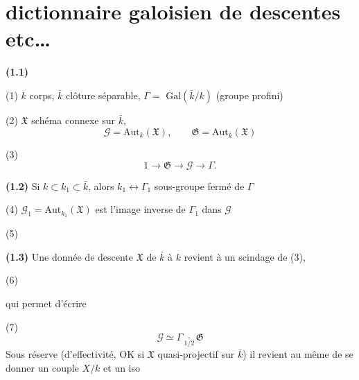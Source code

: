 \documentclass[11pt,a4paper]{article}
\begin{document}
\section{dictionnaire galoisien de descentes etc\ldots}

\textbf{(1.1)}

(1) $k$ corps, $\bar{k}$ clôture séparable, $\Gamma =$  $\mathrm{Gal}(\bar{k}/k)$ (groupe profini)

(2) $\mathfrak{X}$ schéma connexe sur $\bar{k}$,
\[
  \mathcal{G} = \mathrm{Aut}_{k}(\mathfrak{X}), \qquad
  \mathfrak{G} = \mathrm{Aut}_{\bar{k}}(\mathfrak{X})
\]

(3) 
\[
  1 \to \mathfrak{G} \to \mathcal{G} \to \Gamma .
\]

\textbf{(1.2)} Si $k \subset k_1 \subset \bar{k}$, alors $k_1 \longleftrightarrow \Gamma_1$ sous-groupe fermé de $\Gamma$

(4)  $\mathcal{G}_1 = \mathrm{Aut}_{k_1}(\mathfrak{X})$ est  l'image inverse de $\Gamma_1$ dans $\mathcal{G}$

(5)


\textbf{(1.3)} Une donnée de descente  $\mathfrak{X}$ de $\bar{k}$ à $k$ revient à un scindage de (3),

(6)


qui permet d'écrire

(7)
\[
  \mathcal{G} \simeq \Gamma \underset{1/2}{\cdot} \mathfrak{G}
\]
Sous réserve  (d'effectivité,  OK si $\mathfrak{X}$ quasi-projectif sur $\bar{k}$) il revient au même de se donner un couple $X/k$ et un iso
\end{document}
